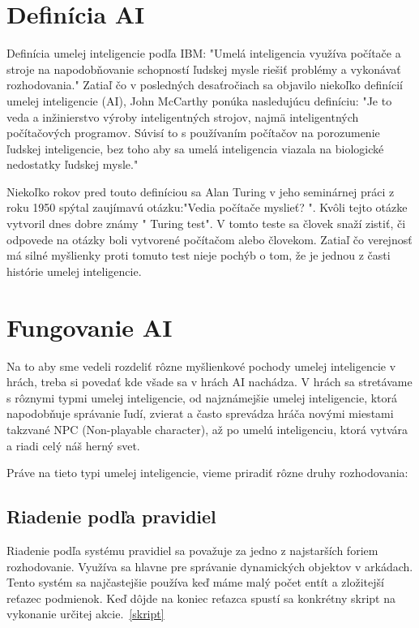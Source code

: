 \documentclass[10pt,oneside,slovak,a4paper]{article}
\begin{document}
\section{Definícia AI} \label{def1}

Definícia umelej inteligencie podľa IBM:
"Umelá inteligencia využíva počítače a stroje na napodobňovanie schopností ľudskej mysle riešiť problémy a vykonávať rozhodovania."
Zatiaľ čo v posledných desaťročiach sa objavilo niekoľko definícií umelej inteligencie (AI), John McCarthy ponúka nasledujúcu definíciu: "Je to veda a inžinierstvo výroby inteligentných strojov, najmä inteligentných počítačových programov. Súvisí to s používaním počítačov na porozumenie ľudskej inteligencie, bez toho aby sa umelá inteligencia viazala na biologické nedostatky ľudskej mysle." 

Niekoľko rokov pred touto definíciou sa Alan Turing v jeho seminárnej práci z roku 1950 spýtal zaujímavú otázku:"Vedia počítače myslieť? ". Kvôli tejto otázke vytvoril dnes dobre známy " Turing test". V tomto teste sa človek snaží zistiť, či odpovede na otázky boli vytvorené počítačom alebo človekom. Zatiaľ čo verejnosť má silné myšlienky proti tomuto test nieje pochýb o tom, že je jednou z časti histórie umelej inteligencie. ~\cite{3.zdroj}



\section{Fungovanie AI} \label{hlavna cast}

Na to aby sme vedeli rozdeliť rôzne myšlienkové pochody umelej inteligencie v hrách, treba si povedať kde všade sa v hrách AI nachádza.
V hrách sa stretávame s rôznymi typmi umelej inteligencie, od najznámejšie umelej inteligencie, ktorá napodobňuje správanie ľudí, zvierat a často sprevádza hráča novými miestami takzvané NPC (Non-playable character), až po umelú inteligenciu, ktorá vytvára a riadi celý náš herný svet. 
~\cite{1.zdroj}

Práve na tieto typi umelej inteligencie, vieme priradiť rôzne druhy rozhodovania:
\vspace{0.5cm}
\subsection{Riadenie podľa pravidiel}

Riadenie podľa systému pravidiel sa považuje za jedno z najstarších foriem rozhodovanie. Využíva sa hlavne pre správanie dynamických objektov v arkádach.
Tento systém sa najčastejšie používa keď máme malý počet entít a zložitejší reťazec podmienok. Keď dôjde na koniec reťazca spustí sa konkrétny skript na vykonanie určitej akcie.~\ref{skript}
\end{document}
